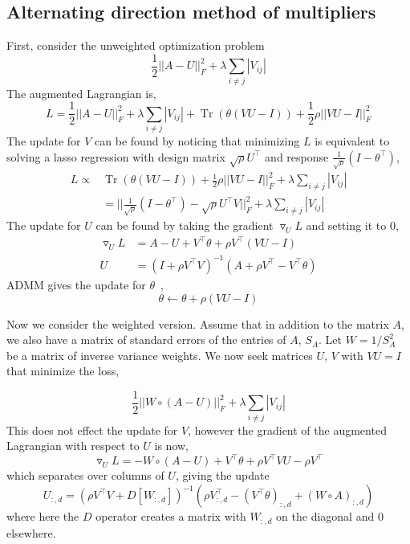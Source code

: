 \documentclass{article}
\DeclareMathOperator{\Tr}{Tr}
\begin{document}
\subsection*{Alternating direction method of multipliers}\label{note}
First, consider the unweighted optimization problem
\begin{equation}
\frac{1}{2} ||A - U||_F^2 + \lambda \sum_{i\neq j}|V_{ij}|
\end{equation}
The augmented Lagrangian is,
\begin{equation*}
L = \frac{1}{2} ||A - U||_F^2 +
   \lambda \sum_{i\neq j}|V_{ij}| +
   \Tr(\theta(VU-I)) + 
   \frac{1}{2} \rho ||VU-I||_F^2
\end{equation*}
The update for $V$ can be found by noticing that minimizing $L$ is equivalent
to solving a lasso regression with design matrix $\sqrt{\rho} U^\top$ and
response $\frac{1}{\sqrt{\rho}}(I-\theta^\top)$,
\begin{align*}
   L \propto& \Tr(\theta(VU-I)) + 
     \frac{1}{2} \rho ||VU-I||_F^2 + \lambda \sum_{i\neq j}|V_{ij}| \\
   &= ||\frac{1}{\sqrt{\rho}}(I-\theta^\top) -
      \sqrt{\rho} U^\top V||_F^2 + \lambda \sum_{i\neq j}|V_{ij}|
\end{align*}
The update for $U$ can be found by taking the gradient $\triangledown_U L$
and setting it to 0,
\begin{align*}
\triangledown_U L &= A - U + V^\top \theta + \rho V^\top(VU-I) \\
U &= (I + \rho V^{\top} V)^{-1}(A + \rho V^\top - V^\top \theta)
\end{align*}
ADMM gives the update for $\theta$~\cite{Boyd2010},
\begin{equation}
\theta \leftarrow \theta + \rho(VU-I)
\end{equation}

Now we consider the weighted version. Assume that in addition to the matrix $A$, we
also have a matrix of standard errors of the entries of $A$, $S_A$. Let
$W = 1/S_A^2$ be a matrix of inverse variance weights. We now
seek matrices $U$, $V$ with $VU=I$ that minimize the loss,

\begin{equation}\label{opt_weights}
\frac{1}{2} || W \circ (A - U)||_F^2 + \lambda \sum_{i\neq j}|V_{ij}|
\end{equation}
This does not effect the update for $V$, however the gradient of the augmented
Lagrangian with respect to $U$ is now,
\begin{equation*}
\triangledown_U L = - W \circ (A- U) + V^\top \theta + \rho V^\top V U - \rho V^\top
\end{equation*}
which separates over columns of $U$, giving the update
\begin{equation}
U_{:, d} = (\rho V^\top V + D[W_{:, d}])^{-1}(\rho V^\top_{:, d} -
  (V^\top \theta)_{:, d} + (W \circ A)_{:, d})
\end{equation}
where here the $D$ operator creates a matrix with $W_{:, d}$ on the
diagonal and 0 elsewhere.
\end{document}
